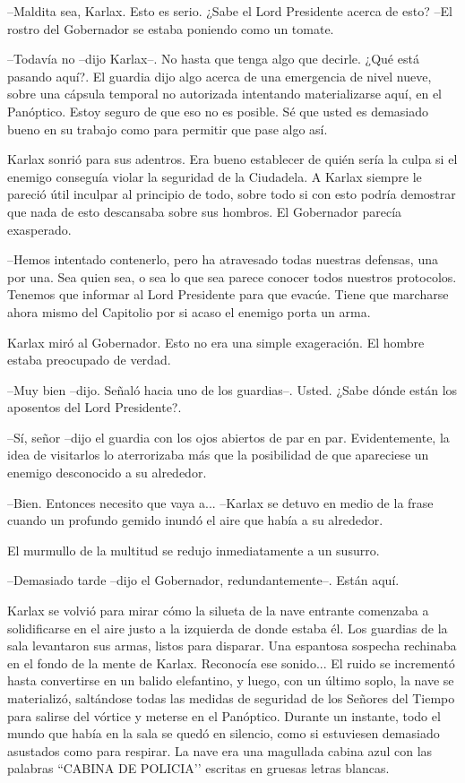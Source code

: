 --Maldita sea, Karlax. Esto es serio. ¿Sabe el Lord Presidente acerca de esto? --El rostro del Gobernador se estaba poniendo como un tomate.

--Todavía no --dijo Karlax--. No hasta que tenga algo que decirle. ¿Qué está pasando aquí?. El guardia dijo algo acerca de una emergencia de nivel nueve, sobre una cápsula temporal no autorizada intentando materializarse aquí, en el Panóptico. Estoy seguro de que eso no es posible. Sé que usted es demasiado bueno en su trabajo como para permitir que pase algo así.

Karlax sonrió para sus adentros. Era bueno establecer de quién sería la culpa si el enemigo conseguía violar la seguridad de la Ciudadela. A Karlax siempre le pareció útil inculpar al principio de todo, sobre todo si con esto podría demostrar que nada de esto descansaba sobre sus hombros. El Gobernador parecía exasperado. 

--Hemos intentado contenerlo, pero ha atravesado todas nuestras defensas, una por una. Sea quien sea, o sea lo que sea parece conocer todos nuestros protocolos. Tenemos que informar al Lord Presidente para que evacúe. Tiene que marcharse ahora mismo del Capitolio por si acaso el enemigo porta un arma.

Karlax miró al Gobernador. Esto no era una simple exageración. El hombre estaba preocupado de verdad.

--Muy bien --dijo. Señaló hacia uno de los guardias--. Usted. ¿Sabe dónde están los aposentos del Lord Presidente?.

--Sí, señor --dijo el guardia con los ojos abiertos de par en par.
Evidentemente, la idea de visitarlos lo aterrorizaba más que la posibilidad de que apareciese un enemigo desconocido a su alrededor.

--Bien. Entonces necesito que vaya a... --Karlax se detuvo en medio de la frase cuando un profundo gemido inundó el aire que había a su alrededor. 

El murmullo de la multitud se redujo inmediatamente a un susurro.

--Demasiado tarde --dijo el Gobernador, redundantemente--. Están aquí.

Karlax se volvió para mirar cómo la silueta de la nave entrante comenzaba a solidificarse en el aire justo a la izquierda de donde estaba él. Los guardias de la sala levantaron sus armas, listos para disparar. Una espantosa sospecha rechinaba en el fondo de la mente de Karlax. Reconocía ese sonido...
El ruido se incrementó hasta convertirse en un balido elefantino, y luego, con un último soplo, la nave se materializó, saltándose todas las medidas de seguridad de los Señores del Tiempo para salirse del vórtice y meterse en el Panóptico.
Durante un instante, todo el mundo que había en la sala se quedó en silencio, como si estuviesen demasiado asustados como para respirar. La nave era una magullada cabina azul con las palabras ``CABINA DE POLICIA’’ escritas en gruesas letras blancas.

